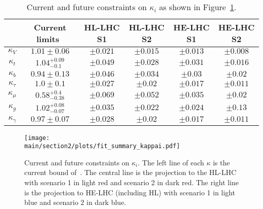 \begin{table}[ht!]
\begin{center}
\begin{tabular}{ |c||c|c|c|c|c|}
  \hline
  & Current limits~\cite{deBlas:2018tjm}  & HL-LHC S1 & HL-LHC S2 & HE-LHC S1&HE-LHC S2 \\
  \hline
   $\kappa_{V}$&$1.01\pm0.06$ &$\pm 0.021$&$\pm 0.015$&$\pm 0.013$&$\pm 0.008$\\
  $\kappa_{t}$&$1.04^{+0.09}_{-0.1}$&$\pm 0.049$&$\pm 0.028$&$\pm 0.031$&$\pm 0.016$\\
  $\kappa_{b}$&$0.94\pm 0.13$ &$\pm 0.046$&$\pm 0.034$&$\pm 0.03$&$\pm 0.02$ \\
  $\kappa_{\tau}$&$1.0\pm 0.1$ &$\pm 0.027$&$\pm 0.02$& $\pm 0.017$&$\pm 0.011$\\
  $\kappa_{\mu}$&$0.58^{+0.4}_{-0.38} $ &$\pm 0.069$&$\pm 0.052$& $\pm 0.035$&$\pm 0.02$\\
  $\kappa_{g}$&$1.02^{+0.08}_{-0.07} $ &$\pm 0.035$&$\pm 0.022$& $\pm 0.024$&$\pm 0.13$\\
  $\kappa_{\gamma}$ &$0.97\pm 0.07 $&$\pm 0.028$&$\pm 0.02$&$\pm 0.017$&$\pm 0.011$\\
\hline
\end{tabular}
\caption{Current and future constraints on $\kappa_{i}$ as shown in Figure~\ref{fig:projection.kappai}.}\label{tab:projection.kappai}
\end{center}
\end{table}
%
\begin{figure}[ht]
\texttt{[image: \\main/section2/plots/fit\_summary\_kappai.pdf]}
\caption{Current and future constraints on $\kappa_{i}$. The left line of each $\kappa$ is the current bound of~\cite{deBlas:2018tjm}. The central line is the projection to the HL-LHC with scenario 1 in light red and scenario 2 in dark red. The right line is the projection to HE-LHC (including HL) with scenario 1 in light blue and scenario 2 in dark blue.}\label{fig:projection.kappai}
\end{figure}

